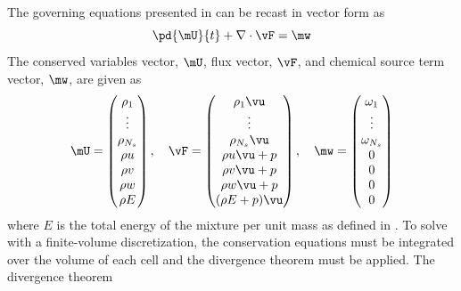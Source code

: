 The governing equations presented in  can
be recast in vector form as
\begin{equation}
  \label{diff-form}
  \pd{\mU}{t} + \nabla \cdot \vF = \mw
\end{equation}
The conserved variables vector, $\mU$, flux vector, $\vF$, and chemical source
term vector, $\mw$, are given as
\begin{equation}
	\begin{matrix}
	\mU=\begin{pmatrix}
   		\rho_1\\
		\vdots \\
		\rho_{N_s} \\
		\rho u \\
		\rho v \\
		\rho w \\
		\rho E
	\end{pmatrix}, \quad
 	\vF = \begin{pmatrix}
		\rho_1  \vu \\
		\vdots \\
		\rho_{N_s} \vu \\
		\rho u\vu + p \\
		\rho v\vu + p \\
		\rho w\vu + p \\
		(\rho E + p) \vu
	\end{pmatrix}, \quad
 	\mw = \begin{pmatrix}
		\omega_1 \\
		\vdots   \\
		\omega_{N_s} \\
    0 \\
    0 \\
    0 \\
    0
	\end{pmatrix}
	\end{matrix}
  \label{fc-variables}
 \end{equation}
where $E$ is the total energy of the mixture per unit mass as defined in
.  To solve  with a finite-volume
discretization, the conservation equations must be integrated over the volume of
each cell and the divergence theorem must be applied.  The divergence theorem
